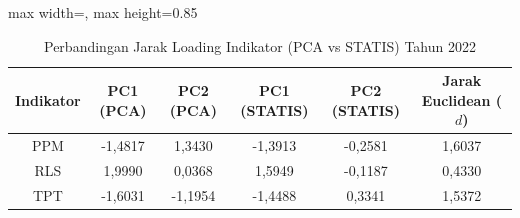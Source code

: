 \begin{table}[H]
\centering
\caption{Perbandingan Jarak Loading Indikator (PCA vs STATIS) Tahun 2022} \label{tab:sample2jarak_loading_2022}
\begin{adjustbox}{max width=\textwidth, max height=0.85\textheight}
\begin{tabular}{|c|c|c|c|c|c|}
\hline
\textbf{Indikator} & \textbf{PC1 (PCA)} & \textbf{PC2 (PCA)} & \textbf{PC1 (STATIS)} & \textbf{PC2 (STATIS)} & \textbf{Jarak Euclidean ($d$)} \\
\hline
PPM & -1,4817 & 1,3430 & -1,3913 & -0,2581 & 1,6037 \\
RLS & 1,9990 & 0,0368 & 1,5949 & -0,1187 & 0,4330 \\
TPT & -1,6031 & -1,1954 & -1,4488 & 0,3341 & 1,5372 \\
\hline
\end{tabular}
\end{adjustbox}
\end{table}